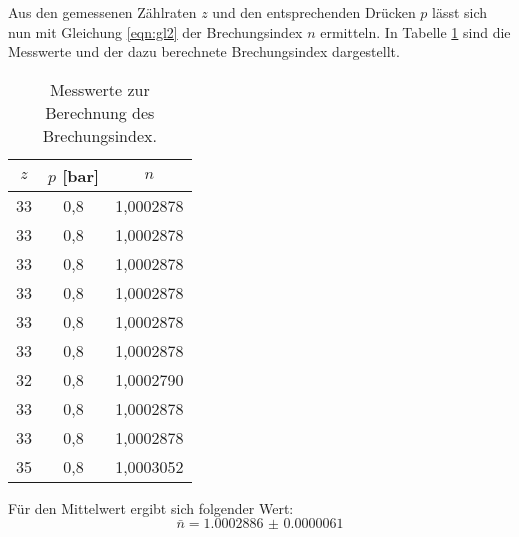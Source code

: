 Aus den gemessenen Zählraten $z$ und den entsprechenden Drücken $p$ lässt sich nun mit Gleichung \eqref{eqn:gl2} der Brechungsindex $n$ ermitteln.
In Tabelle \ref{tab:n} sind die Messwerte und der dazu berechnete Brechungsindex dargestellt.
\begin{table}
  \centering
  \caption{Messwerte zur Berechnung des Brechungsindex.}
  \label{tab:n}
  \begin{tabular}{c c c}
    \toprule
    $z$ & $p$ [\si{\bar}] & $n$ \\
    \midrule
    33 & 0,8 & 1,0002878 \\
    33 & 0,8 & 1,0002878 \\
    33 & 0,8 & 1,0002878 \\
    33 & 0,8 & 1,0002878 \\
    33 & 0,8 & 1,0002878 \\
    33 & 0,8 & 1,0002878 \\
    32 & 0,8 & 1,0002790 \\
    33 & 0,8 & 1,0002878 \\
    33 & 0,8 & 1,0002878 \\
    35 & 0,8 & 1,0003052 \\
    \bottomrule
  \end{tabular}
\end{table}
\FloatBarrier
Für den Mittelwert ergibt sich folgender Wert:
\begin{equation*}
  \bar n = \num{1.0002886(61)}
\end{equation*}

